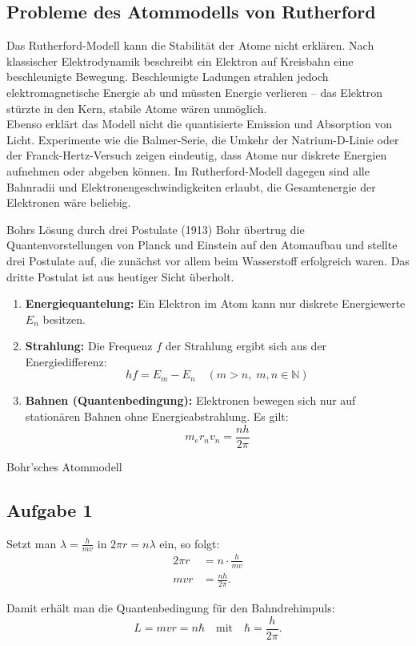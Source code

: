 \documentclass[11pt,a4paper,oneside]{article}
\begin{document}
	
	\subsection{Probleme des Atommodells von Rutherford}
	
	Das Rutherford-Modell kann die Stabilität der Atome nicht erklären. 
	Nach klassischer Elektrodynamik beschreibt ein Elektron auf Kreisbahn 
	eine beschleunigte Bewegung. Beschleunigte Ladungen strahlen jedoch 
	elektromagnetische Energie ab und müssten Energie verlieren – 
	das Elektron stürzte in den Kern, stabile Atome wären unmöglich. \\
	
	Ebenso erklärt das Modell nicht die quantisierte Emission und Absorption 
	von Licht. Experimente wie die Balmer-Serie, die Umkehr der Natrium-D-Linie 
	oder der Franck-Hertz-Versuch zeigen eindeutig, dass Atome nur diskrete 
	Energien aufnehmen oder abgeben können. Im Rutherford-Modell dagegen 
	sind alle Bahnradii und Elektronengeschwindigkeiten erlaubt, 
	die Gesamtenergie der Elektronen wäre beliebig.
	
	\begin{theo}{Bohrs Lösung durch drei Postulate (1913)}
		Bohr übertrug die Quantenvorstellungen von Planck und Einstein 
		auf den Atomaufbau und stellte drei Postulate auf, 
		die zunächst vor allem beim Wasserstoff erfolgreich waren. 
		Das dritte Postulat ist aus heutiger Sicht überholt.
		
		\begin{enumerate}
			\item \textbf{Energiequantelung:} 
			Ein Elektron im Atom kann nur diskrete Energiewerte $E_n$ besitzen.
			
			\item \textbf{Strahlung:} 
			Die Frequenz $f$ der Strahlung ergibt sich aus der Energiedifferenz:
			\[
			h f = E_m - E_n \quad (m > n, \; m,n \in \mathbb{N})
			\]
			
			\item \textbf{Bahnen (Quantenbedingung):} 
			Elektronen bewegen sich nur auf stationären Bahnen ohne Energieabstrahlung. 
			Es gilt:
			\[
			m_e r_n v_n = \frac{n h}{2 \pi}
			\]
		\end{enumerate}
	\end{theo}
	
	\begin{loesung}{Bohr'sches Atommodell}
		\subsection*{Aufgabe 1}		
		Setzt man $\lambda = \tfrac{h}{mv}$ in $2 \pi r = n \lambda$ ein, so folgt:
		\begin{align*}
			2 \pi r &= n \cdot \frac{h}{m v} \\
			m v r &= \frac{n h}{2 \pi}.
		\end{align*}
		
		Damit erhält man die Quantenbedingung für den Bahndrehimpuls:
		\[
		L = m v r = n \hbar \quad \text{mit} \quad \hbar = \frac{h}{2 \pi}.
		\]
	\end{loesung}
	
\end{document}
